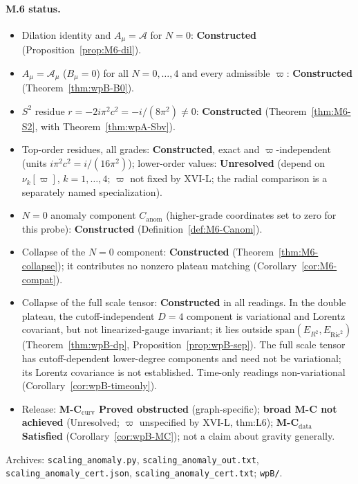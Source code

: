 \documentclass{article}
\theoremstyle{remark}
\begin{document}
\paragraph{M.6 status.}
\begin{itemize}
\item Dilation identity and $A_\mu=\mathcal A$ for $N=0$: \textbf{Constructed} (Proposition~\ref{prop:M6-dil}).
\item $A_\mu=\mathcal A_\mu$ ($B_\mu=0$) for all $N=0,\dots,4$ and every admissible $\varpi$: \textbf{Constructed} (Theorem~\ref{thm:wpB-B0}).
\item $S^2$ residue $r=-2i\pi^2 c^2=-i/(8\pi^2)\neq0$: \textbf{Constructed} (Theorem~\ref{thm:M6-S2}, with Theorem~\ref{thm:wpA-Sbv}).
\item Top-order residues, all grades: \textbf{Constructed}, exact and $\varpi$-independent (units $i\pi^2c^2=i/(16\pi^2)$); lower-order values: \textbf{Unresolved} (depend on $\nu_k[\varpi]$, $k=1,\dots,4$; $\varpi$ not fixed by XVI-L; the radial comparison is a separately named specialization).
\item $N=0$ anomaly component $C_{\mathrm{anom}}$ (higher-grade coordinates set to zero for this probe): \textbf{Constructed} (Definition~\ref{def:M6-Canom}).
\item Collapse of the $N=0$ component: \textbf{Constructed} (Theorem~\ref{thm:M6-collapse}); it contributes no nonzero plateau matching (Corollary~\ref{cor:M6-compat}).
\item Collapse of the full scale tensor: \textbf{Constructed} in all readings. In the double plateau, the cutoff-independent $D=4$ component is variational and Lorentz covariant, but not linearized-gauge invariant; it lies outside $\mathrm{span}(E_{R^2},E_{\mathrm{Ric}^2})$ (Theorem~\ref{thm:wpB-dp}, Proposition~\ref{prop:wpB-sep}). The full scale tensor has cutoff-dependent lower-degree components and need not be variational; its Lorentz covariance is not established. Time-only readings non-variational (Corollary~\ref{cor:wpB-timeonly}).
\item Release: \textbf{M-C$_{\mathrm{curv}}$ Proved obstructed} (graph-specific); \textbf{broad M-C not achieved} (Unresolved; $\varpi$ unspecified by XVI-L, thm:L6); \textbf{M-C$_{\mathrm{data}}$ Satisfied} (Corollary~\ref{cor:wpB-MC}); not a claim about gravity generally.
\end{itemize}
\begin{sloppypar}\noindent
Archives: \texttt{scaling\_anomaly.py}, \texttt{scaling\_anomaly\_out.txt}, \texttt{scaling\_anomaly\_cert.json}, \texttt{scaling\_anomaly\_cert.txt}; \texttt{wpB/}.
\end{sloppypar}
\end{document}
